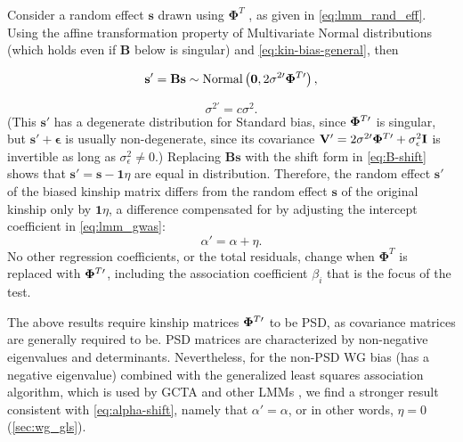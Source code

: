 \documentclass[11pt]{article}
\newcommand{\kinMat}[1][T]{%
  \ensuremath{%
    \mathbf{\Phi}^{#1}
  }%
  \xspace%
}%
\newcommand{\kinMatPrime}{%
  \ensuremath{%
    \mathbf{\Phi}^{T\prime}
  }%
  \xspace%
}%
\begin{document}
\begin{linenumbers}
Consider a random effect $\mathbf{s}$ drawn using \kinMat, as given in \cref{eq:lmm_rand_eff}.
Using the affine transformation property of Multivariate Normal distributions (which holds even if $\mathbf{B}$ below is singular) and \cref{eq:kin-bias-general}, then
\begin{linenomath*}
$$
\mathbf{s}'
=
\mathbf{B} \mathbf{s}
\sim
\text{Normal} \left( \mathbf{0}, 2 \sigma^{2\prime} \kinMatPrime \right),
$$
\end{linenomath*}
\begin{equation}
  \label{eq:sigma-rescale}
  \sigma^{2\prime} = c \sigma^2
  .
\end{equation}
(This $\mathbf{s}'$ has a degenerate distribution for Standard bias, since $\kinMatPrime$ is singular, but $\mathbf{s}' + \boldsymbol{\epsilon}$ is usually non-degenerate, since its covariance $\mathbf{V}' = 2 \sigma^{2\prime} \kinMatPrime + \sigma^2_\epsilon \mathbf{I}$ is invertible as long as $\sigma^2_\epsilon \ne 0$.)
Replacing $\mathbf{B} \mathbf{s}$ with the shift form in \cref{eq:B-shift} shows that
$\mathbf{s}' = \mathbf{s} - \mathbf{1} \eta$
are equal in distribution.
Therefore, the random effect $\mathbf{s}'$ of the biased kinship matrix differs from the random effect $\mathbf{s}$ of the original kinship only by $\mathbf{1} \eta$, a difference compensated for by adjusting the intercept coefficient in \cref{eq:lmm_gwas}:
\begin{equation}
  \label{eq:alpha-shift}
  \alpha' = \alpha + \eta.
\end{equation}
No other regression coefficients, or the total residuals, change when \kinMat is replaced with $\kinMatPrime$, including the association coefficient $\beta_i$ that is the focus of the test.

The above results require kinship matrices $\kinMatPrime$ to be PSD, as covariance matrices are generally required to be.
PSD matrices are characterized by non-negative eigenvalues and determinants.
Nevertheless, for the non-PSD WG bias (has a negative eigenvalue) combined with the generalized least squares association algorithm, which is used by GCTA and other LMMs \citep{kang_efficient_2008, kang_variance_2010, yang_advantages_2014}, we find a stronger result consistent with \cref{eq:alpha-shift}, namely that $\alpha' = \alpha$, or in other words, $\eta = 0$ (\cref{sec:wg_gls}).


\end{linenumbers}
\end{document}
